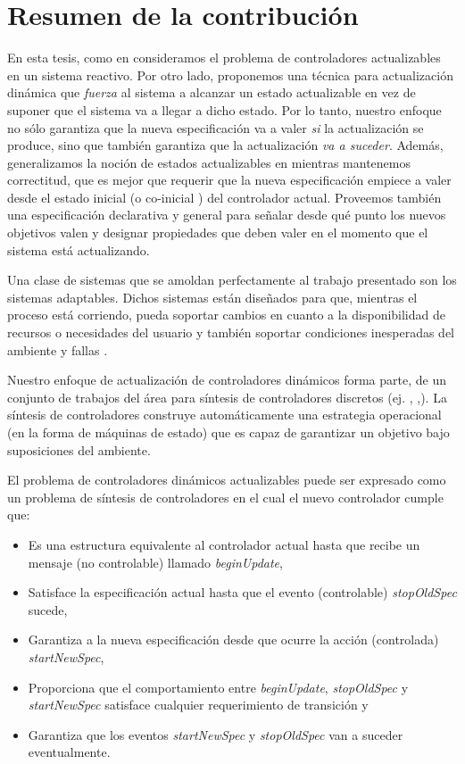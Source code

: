 \section{Resumen de la contribución}

En esta tesis, como en \cite{6224401,PanzicaLaManna:2013:FCC:2487336.2487349} consideramos el problema de controladores
actualizables en un sistema reactivo. Por otro lado, proponemos una técnica para actualización dinámica que
\emph{fuerza} al sistema a alcanzar un estado actualizable en vez de suponer que el sistema va a llegar a dicho estado.
Por lo tanto, nuestro enfoque no sólo garantiza que la nueva especificación va a valer \emph{si} la actualización se
produce, sino que también garantiza que la actualización \emph{va a suceder}. Además, generalizamos la noción de estados
actualizables en \cite{6224401,PanzicaLaManna:2013:FCC:2487336.2487349} mientras mantenemos correctitud, que es mejor que
requerir que la nueva especificación empiece a valer desde el estado inicial (o co-inicial 
\cite{PanzicaLaManna:2013:FCC:2487336.2487349}) del controlador actual. Proveemos también una especificación declarativa
y general para señalar desde qué punto los nuevos objetivos valen y designar propiedades que deben valer en el momento
que el sistema está actualizando. 

Una clase de sistemas que se amoldan perfectamente al trabajo presentado son los sistemas adaptables. Dichos sistemas están diseñados
para que, mientras el proceso está corriendo, pueda soportar cambios en cuanto a la disponibilidad de recursos o 
necesidades del usuario y también soportar condiciones inesperadas del ambiente y fallas \cite{SEAMS}. 

Nuestro enfoque de actualización de controladores dinámicos forma parte, de un conjunto de trabajos del área para
síntesis de controladores discretos (ej. \cite{21072}, \cite{Piterman},\cite{D'ippolito:2013:SNE:2430536.2430543}).
La síntesis de controladores construye automáticamente una estrategia operacional (en la forma de máquinas de estado) que
es capaz de garantizar un objetivo bajo suposiciones del ambiente.

El problema de controladores dinámicos actualizables puede ser expresado como un problema de síntesis de controladores
en el cual el nuevo controlador cumple que:

\begin{itemize}
\itemsep-4mm
\item Es una estructura equivalente al controlador actual hasta que recibe un mensaje (no controlable) llamado
\emph{beginUpdate},
\item Satisface la especificación actual hasta que el evento (controlable) \emph{stopOldSpec} sucede,
\item Garantiza a la nueva especificación desde que ocurre la acción (controlada) \emph{startNewSpec},
\item Proporciona que el comportamiento entre \emph{beginUpdate}, \emph{stopOldSpec} y \emph{startNewSpec} satisface
cualquier requerimiento de transición y
\item Garantiza que los eventos \emph{startNewSpec} y \emph{stopOldSpec} van a suceder eventualmente.
\end{itemize}


